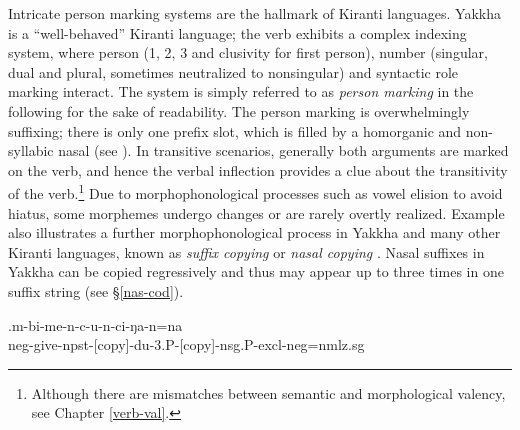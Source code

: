 Intricate person marking systems are the hallmark of Kiranti languages. Yakkha is a “well-behaved” Kiranti language; the verb exhibits a complex indexing system, where person (1, 2, 3 and clusivity for first person), number (singular, dual and plural, sometimes neutralized to nonsingular) and syntactic role marking interact. The system is simply referred to as \emph{person marking} in the following for the sake of readability. The person marking  is overwhelmingly suffixing; there is only one prefix slot, which is filled by a homorganic  and non-syllabic nasal (see \Next). In transitive scenarios, generally both arguments are marked on the verb, and hence the verbal inflection provides a clue about the transitivity of the verb.\footnote{Although there are mismatches between semantic and morphological valency, see Chapter \ref{verb-val}.} Due to morphophonological processes such as vowel elision to avoid hiatus, some morphemes undergo changes or are rarely overtly realized. Example \Next also illustrates a further morphophonological process in Yakkha and many other Kiranti languages, known as \emph{suffix copying} or \emph{nasal copying} \citep{Bickel2003Belhare, Doornenbal2009A-grammar, Ebert2003Kiranti, Schikowski2012_Morphology}. Nasal suffixes in Yakkha  can be copied regressively and thus may appear up to three times in one suffix string (see §\ref{nas-cod}).


\exg.m-bi-me-n-c-u-n-ci-ŋa-n=na\\
{\sc neg-}give{\sc -npst-[copy]-du-3.P-[copy]-nsg.P-excl-neg=nmlz.sg}\\


